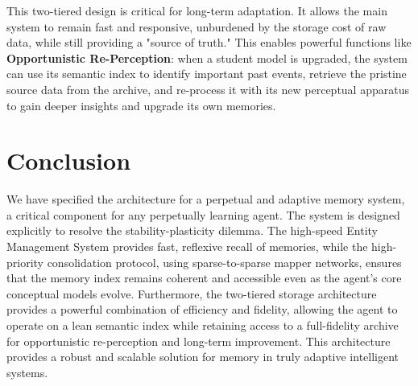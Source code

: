 \documentclass{article}
\begin{document}
This two-tiered design is critical for long-term adaptation. It allows the main system to remain fast and responsive, unburdened by the storage cost of raw data, while still providing a "source of truth." This enables powerful functions like \textbf{Opportunistic Re-Perception}: when a student model is upgraded, the system can use its semantic index to identify important past events, retrieve the pristine source data from the archive, and re-process it with its new perceptual apparatus to gain deeper insights and upgrade its own memories.

\section{Conclusion}

We have specified the architecture for a perpetual and adaptive memory system, a critical component for any perpetually learning agent. The system is designed explicitly to resolve the stability-plasticity dilemma. The high-speed Entity Management System provides fast, reflexive recall of memories, while the high-priority consolidation protocol, using sparse-to-sparse mapper networks, ensures that the memory index remains coherent and accessible even as the agent's core conceptual models evolve. Furthermore, the two-tiered storage architecture provides a powerful combination of efficiency and fidelity, allowing the agent to operate on a lean semantic index while retaining access to a full-fidelity archive for opportunistic re-perception and long-term improvement. This architecture provides a robust and scalable solution for memory in truly adaptive intelligent systems.



\end{document}
